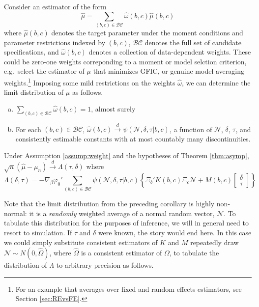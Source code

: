 

Consider an estimator of the form 
	$$\widehat{\mu} = \sum_{(b,c) \in \mathcal{BC}} \widehat{\omega}(b,c) \widehat{\mu}(b,c)$$
where $\widehat{\mu}(b,c)$ denotes the target parameter under the moment conditions and parameter restrictions indexed by $(b,c)$, $\mathcal{BC}$ denotes the full set of candidate specifications, and $\widehat{\omega}(b,c)$ denotes a collection of data-dependent weights.
These could be zero-one weights correponding to a moment or model selction criterion, e.g.\ select the estimator of $\mu$ that minimizes GFIC, or genuine model averaging weights.\footnote{For an example that averages over fixed and random effects estimators, see Section \ref{sec:REvsFE}.}
Imposing some mild restrictions on the weights $\widehat{\omega}$, we can determine the limit distribution of $\mu$ as follows.
\begin{assump}\mbox{}
	\begin{enumerate}[(a)] 
		\item $\sum_{(b,c) \in \mathcal{BC}} \widehat{\omega}(b,c) = 1$, almost surely
    \item For each $(b,c) \in \mathcal{BC}$, $\widehat{\omega}(b,c) \overset{d}{\rightarrow} \psi(\mathscr{N}, \delta, \tau|b,c)$,  a function of $\mathscr{N}$, $\delta$, $\tau$, and consistently estimable constants with at most countably many discontinuities.
	\end{enumerate}
\label{assump:weight}
\end{assump}

\begin{cor}
  Under Assumption \ref{assump:weight} and the hypotheses of Theorem \ref{thm:asymp},  
	$\sqrt{n}\left(\widehat{\mu} - \mu_n\right) \overset{d}{\rightarrow} \Lambda(\tau,\delta)$
where
	\begin{equation}
		\Lambda(\delta,\tau) = -\nabla_\beta\varphi_0' \sum_{(b,c) \in \mathcal{BC}} \psi(\mathscr{N},\delta, \tau|b,c) \left\{\Xi_b' K(b,c) \Xi_c \mathscr{N} + M(b,c)  \left[\begin{array}{c}\delta \\ \tau \end{array} \right]\right\}
	\end{equation}
\end{cor}
Note that the limit distribution from the preceding corollary is highly non-normal: it is a \emph{randomly} weighted average of a normal random vector, $\mathscr{N}$.
To tabulate this distribution for the purposes of inference, we will in general need to resort to simulation.
If $\tau$ and $\delta$ were known, the story would end here.
In this case we could simply substitute consistent estimators of $K$ and $M$ repeatedly draw $\mathscr{N} \sim N(0, \widehat{\Omega})$, where $\widehat{\Omega}$ is a consistent estimator of $\Omega$, to tabulate the distribution of $\Lambda$ to arbitrary precision as follows.

